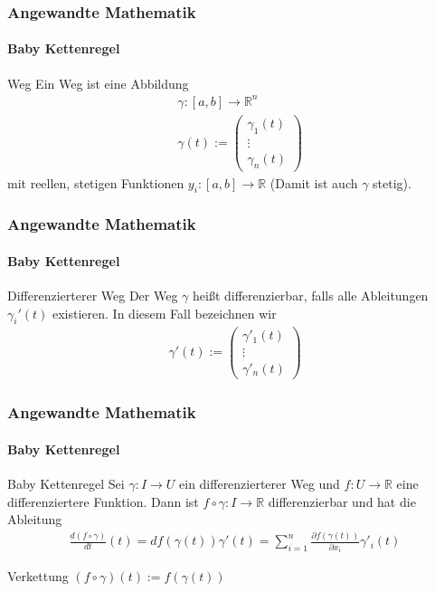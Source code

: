 \documentclass{beamer}
\begin{document}
\begin{frame}
    \frametitle{Angewandte Mathematik}
\framesubtitle{Baby Kettenregel}
    \begin{block}{Weg}
Ein Weg ist eine Abbildung  
\begin{align*}
& \gamma:  [a,b] \to \mathbb{R}^n \\
& \gamma (t) :=  \begin{pmatrix} \gamma_1(t) \\ \vdots \\ \gamma_n(t) \end{pmatrix}
\end{align*}
mit reellen, stetigen Funktionen $y_i : [a,b] \to \mathbb{R}$ (Damit ist auch $\gamma$ stetig).
\end{block}

 \end{frame}


\begin{frame}
    \frametitle{Angewandte Mathematik}
\framesubtitle{Baby Kettenregel}
    \begin{block}{Differenzierterer Weg}
Der Weg $\gamma$ heißt differenzierbar, falls alle Ableitungen $\gamma_i'(t)$ existieren. In diesem Fall bezeichnen wir
\begin{align*}
 \gamma' (t) :=  \begin{pmatrix} \gamma'_1(t) \\ \vdots \\ \gamma'_n(t) \end{pmatrix}
\end{align*}
\end{block}

 \end{frame}

\begin{frame}
    \frametitle{Angewandte Mathematik}
\framesubtitle{Baby Kettenregel}
    \begin{block}{Baby Kettenregel}
Sei $\gamma: I \to U$ ein differenzierterer Weg und $f: U \to \mathbb{R}$ eine differenziertere Funktion. Dann ist $f \circ \gamma : I \to \mathbb{R}$ differenzierbar und hat die Ableitung
\begin{align*}
\frac{d(f \circ \gamma)}{dt}(t) = df(\gamma(t))\gamma'(t) = \sum_{i=1}^n  \frac{\partial f (\gamma(t))}{\partial x_i} \gamma'_i(t)
\end{align*} 
\end{block}
    \begin{block}{Verkettung}
$(f \circ \gamma)(t) := f (\gamma(t)) $

\end{block}
 \end{frame}
\end{document}
